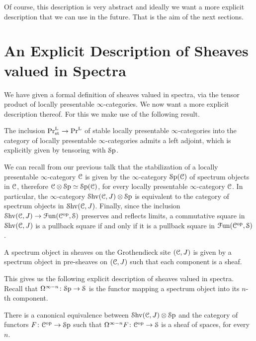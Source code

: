 \documentclass[10pt]{amsart}
\begin{document}
Of course, this description is very abstract and ideally we want a more explicit description that we can use in the future. That is the aim of the next sections.

\section{An Explicit Description of Sheaves valued in Spectra}

We have given a formal definition of sheaves valued in spectra, via the tensor product of locally presentable $\infty$-categories. We now want a more explicit description thereof. For this we make use of the following result.

\begin{proposition}
 The inclusion $\Pr^{\mathrm{L}}_{\mathrm{st}} \to \Pr^{\mathrm{L}}$ of stable locally presentable $\infty$-categories into the category of locally presentable $\infty$-categories admits a left adjoint, which is explicitly given by tensoring with $\mathcal{S}\mathrm{p}$.
\end{proposition}

We can recall from our previous talk that the stabilization of a locally presentable $\infty$-category $\mathcal{C}$ is given by the $\infty$-category $\mathcal{S}\mathrm{p}(\mathcal{C})$ of spectrum objects in $\mathcal{C}$, therefore $\mathcal{C}\otimes\mathcal{S}\mathrm{p}  \simeq \mathcal{S}\mathrm{p}(\mathcal{C})$, for every locally presentable $\infty$-category $\mathcal{C}$. In particular, the $\infty$-category $ \mathcal{S}\mathrm{hv}(\mathcal{C},J)\otimes \mathcal{S}\mathrm{p}$ is equivalent to the category of spectrum objects in $\mathcal{S}\mathrm{hv}(\mathcal{C},J)$. Finally, since the inclusion $\mathcal{S}\mathrm{hv}(\mathcal{C},J) \to \mathcal{F}\mathrm{un}(\mathcal{C}^{\mathrm{op}},\mathcal{S})$ preserves and reflects limits, a commutative square in $\mathcal{S}\mathrm{hv}(\mathcal{C},J)$ is a pullback square if and only if it is a pullback square in $\mathcal{F}\mathrm{un}(\mathcal{C}^{\mathrm{op}},\mathcal{S})$.

\begin{proposition}
  A spectrum object in sheaves on the Grothendieck site $(\mathcal{C},J)$ is given by a spectrum object in pre-sheaves on $(\mathcal{C},J)$ such that each component is a sheaf.
\end{proposition}

This gives us the following explicit description of sheaves valued in spectra. Recall that $\Omega^{\infty-n}\colon\mathcal{S}\mathrm{p}\to\mathcal{S}$ is the functor mapping a spectrum object into its $n$-th component.
\begin{theorem}
  There is a canonical equivalence between $\mathcal{S}\mathrm{hv}(\mathcal{C},J)\otimes\mathcal{S}\mathrm{p}$ and the category of functors $F\colon \mathcal{C}^{\mathrm{op}} \to \mathcal{S}\mathrm{p}$ such that $\Omega^{\infty - n} F\colon \mathcal{C}^{\mathrm{op}} \to \mathcal{S}$ is a sheaf of spaces, for every $n$.
\end{theorem}
\end{document}

